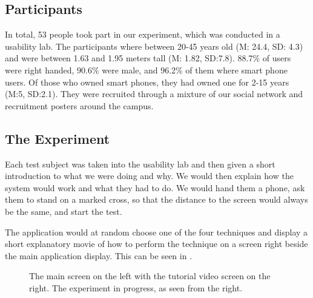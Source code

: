 \subsection{Participants}
In total, 53 people took part in our experiment, which was conducted in a usability lab. 
The participants where between 20-45 years old (M: 24.4, SD: 4.3) and were between 1.63 and 1.95 meters tall (M: 1.82, SD:7.8). 
88.7\% of users were right handed, 90.6\% were male, and 96.2\% of them where smart phone users. 
Of those who owned smart phones, they had owned one for 2-15 years (M:5, SD:2.1). 
They were recruited through a mixture of our social network and recruitment posters around the campus. 

\subsection{The Experiment}

Each test subject was taken into the usability lab and then given a short introduction to what we were doing and why. 
We would then explain how the system would work and what they had to do. 
We would hand them a phone, ask them to stand on a marked cross, so that the distance to the screen would always be the same, and start the test.

The application would at random choose one of the four techniques and display a short explanatory movie of how to perform the technique on a screen right beside the main application display. This can be seen in .

\begin{figure}[H]
	\centering
	\caption{
		\protect{} The main screen on the left with the tutorial video screen on the right.
		\protect{} The experiment in progress, as seen from the right. 
	}
	\label{fig:setup}
\end{figure} 


